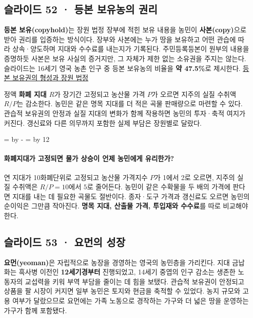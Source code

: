 \documentclass[10pt,a4paper]{article}
\newcommand{\ReserveQuestionSpace}{%
  \par\begingroup
  \dimen0=\pagegoal \advance\dimen0 by -\pagetotal
  \dimen2=\baselineskip \multiply\dimen2 by 12
  \ifdim\dimen0<\dimen2 \newpage\fi
  \endgroup}
\begin{document}
\subsection{슬라이드 52 · 등본 보유농의 권리}
\textbf{등본 보유(copyhold)}는 장원 법정 장부에 적힌 보유 내용을 농민이 \textbf{사본(copy)}으로 받아 권리를 입증하는 방식이다. 장부와 사본에는 누가 땅을 보유하고 어떤 관습에 따라 상속·양도하며 지대와 수수료를 내는지가 기록된다. 주민등록등본이 원부의 내용을 증명하듯 사본은 보유 사실의 증거지만, 그 자체가 제한 없는 소유권을 주지는 않는다. 슬라이드는 16세기 영국 농촌 인구 중 등본 보유농의 비율을 \textbf{약 47.5\%}로 제시한다. \href{https://www.cambridge.org/core/books/abs/landlords-and-tenants-in-britain-14401660/common-law-and-manor-courts-lords-copyholders-and-doing-justice-in-early-tudor-england/C34860CC5B6469C74BF5A06B3B3B18D1}{등본 보유권의 형성과 장원 법정}\par

정액 \textbf{화폐 지대 $R$}가 장기간 고정되고 농산물 가격 $P$가 오르면 지주의 실질 수취액 $R/P$는 감소한다. 농민은 같은 명목 지대를 더 적은 곡물 판매량으로 마련할 수 있다. 관습적 보유권의 안정과 실질 지대의 변화가 함께 작용하면 농민의 투자·축적 여지가 커진다. 갱신료와 다른 의무까지 포함한 실제 부담은 장원별로 달랐다.\par

\ReserveQuestionSpace
\paragraph{화폐지대가 고정되면 물가 상승이 언제 농민에게 유리한가?}
연 지대가 10화폐단위로 고정되고 농산물 가격지수 $P$가 1에서 2로 오르면, 지주의 실질 수취액은 $R/P=10$에서 $5$로 줄어든다. 농민이 같은 수확물을 두 배의 가격에 판다면 지대를 내는 데 필요한 곡물도 절반이다. 종자·도구 가격과 갱신료도 오르면 농민의 순이익은 그만큼 작아진다. \textbf{명목 지대, 산출물 가격, 투입재와 수수료}를 따로 비교해야 한다.\par

\subsection{슬라이드 53 · 요먼의 성장}
\textbf{요먼(yeoman)}은 자립적으로 농장을 경영하는 영국의 농민층을 가리킨다. 지대 금납화는 흑사병 이전인 \textbf{12세기경부터} 진행되었고, 14세기 중엽의 인구 감소는 생존한 노동자의 교섭력을 키워 부역 부담을 줄이는 데 힘을 보탰다. 관습적 보유권이 안정되고 상품을 팔 시장이 커지면 일부 농민은 토지와 현금을 축적할 수 있었다. 농지 규모와 고용 여부가 달랐으므로 요먼에는 가족 노동으로 경작하는 가구와 더 넓은 땅을 운영하는 가구가 함께 포함됐다.\par
\end{document}
